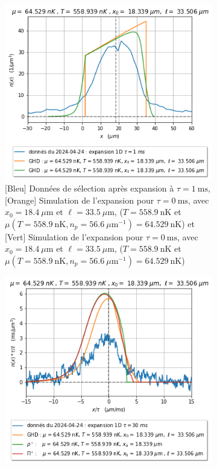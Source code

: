 \documentclass[a3, 10pt,twoside]{article}          %
\theoremstyle{plain}
\theoremstyle{definition}
\theoremstyle{remark}
\theoremstyle{definition} %
\begin{document}
\begin{figure}[H]
    \begin{subfigure}[b]{0.45\textwidth}
        \centering
        \includegraphics[width=\textwidth]{Figures/simul_expansion_1_33}
        \caption{{\color{blue}[Bleu] Données de sélection après expansion à $\tau = 1~\text{ms}$}, {\color{orange}[Orange] Simulation de l'expansion pour $\tau = 0~\text{ms}$, avec $x_0 = 18.4~\mu \text{m}$ et $\ell = 33.5~\mu \text{m}$, ($T = 558.9~\text{nK}$ et $\mu(T = 558.9~\text{nK}, n_p = 56.6~\mu \text{m}^{-1}) = 64.529~\text{nK}$)} et {\color{OliveGreen}[Vert] Simulation de l'expansion pour $\tau = 0~\text{ms}$, avec $x_0 = 18.4~\mu \text{m}$ et $\ell = 33.5~\mu \text{m}$, ($T = 558.9~\text{nK}$ et $\mu(T = 558.9~\text{nK}, n_p = 56.6~\mu \text{m}^{-1}) = 64.529~\text{nK}$)}}
        \label{fig:expansion_1_33}
    \end{subfigure}
    \hfill
    \begin{subfigure}[b]{0.45\textwidth}
        \centering
        \includegraphics[width=\textwidth]{Figures/simul_expansion_30_33}

\end{subfigure}
\end{figure}
\end{document}
